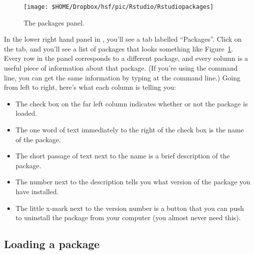 \begin{figure}[t]
\begin{center}
\texttt{[image: \$HOME/Dropbox/hsf/pic/Rstudio/Rstudiopackages]}
\caption{The packages panel.}
\label{fig:packagepanel}
\end{center}
\end{figure}

In the lower right hand panel in \Rstudio, you'll see a tab labelled ``Packages''. Click on the tab, and you'll see a list of packages that looks something like Figure~\ref{fig:packagepanel}. Every row in the panel corresponds to a different package, and every column is a useful piece of information about that package. (If you're using the command line, you can get the same information by typing  at the command line.) Going from left to right, here's what each column is telling you:

\begin{itemize}
\item The check box on the far left column indicates whether or not the package is loaded.
\item The one word of text immediately to the right of the check box is the name of the package.
\item The short passage of text next to the name is a brief description of the package.
\item The number next to the description tells you what version of the package you have installed.
\item The little x-mark next to the version number is a button that you can push to uninstall the package from your computer (you almost never need this).
\end{itemize}

\subsection{Loading a package\label{sec:packageload}}

